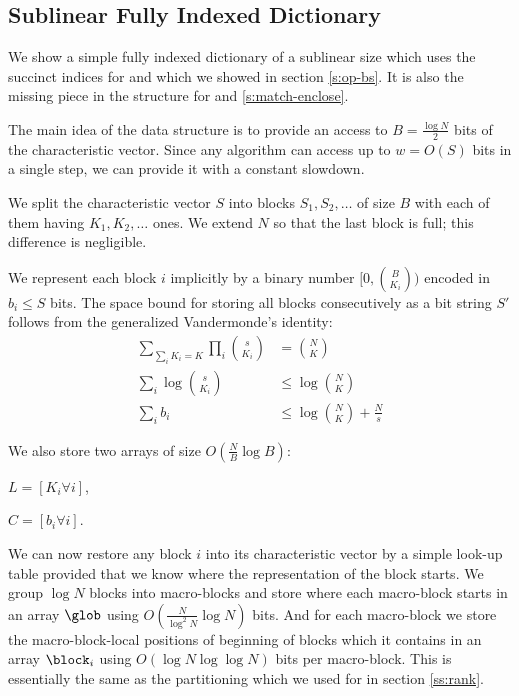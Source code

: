 \subsection{Sublinear Fully Indexed Dictionary}\label{ss:sublinear-fid}


We show a simple fully indexed dictionary of a sublinear size which uses the succinct indices for \rank{} and \select{} which we showed in section \ref{s:op-bs}.
It is also the missing piece in the structure for \match{} and \enclose{} \ref{s:match-enclose}.

The main idea of the data structure is to provide an access to $B = \frac{\log N}{2}$ bits of the characteristic vector.
Since any algorithm can access up to $w = O(S)$ bits in a single step, we can provide it with a constant slowdown.

We split the characteristic vector $S$ into blocks $S_1, S_2, \ldots$ of size $B$ with each of them having $K_1, K_2, \ldots$ ones.
We extend $N$ so that the last block is full; this difference is negligible.

We represent each block $i$ implicitly by a binary number $[0, {B \choose K_i})$ encoded in $b_i \le S$ bits.
The space bound for storing all blocks consecutively as a bit string $S'$ follows from the generalized Vandermonde's identity:
\begin{align*}
	\sum_{\sum_i K_i = K} \prod_i {s \choose K_i} &= {N \choose K} \\
	\sum_i \log {s \choose K_i} &\le \log {N \choose K} \\
	\sum_i b_i &\le \log {N \choose K} + \frac{N}{s}
\end{align*}

We also store two arrays of size $O(\frac{N}{B} \log B)$:
\begin{iteminline}
	\item $L = [K_i \forall i]$,
	\item $C = [b_i \forall i]$.
\end{iteminline}

We can now restore any block $i$ into its characteristic vector by a simple look-up table provided that we know where the representation of the block starts.
We group $\log N$ blocks into macro-blocks and store where each macro-block starts in an array $\glob$ using $O(\frac{N}{\log^2 N} \log N)$ bits.
And for each macro-block we store the macro-block-local positions of beginning of blocks which it contains in an array $\block_i$ using $O(\log N \log \log N)$ bits per macro-block.
This is essentially the same as the partitioning which we used for \rank{} in section \ref{ss:rank}.

